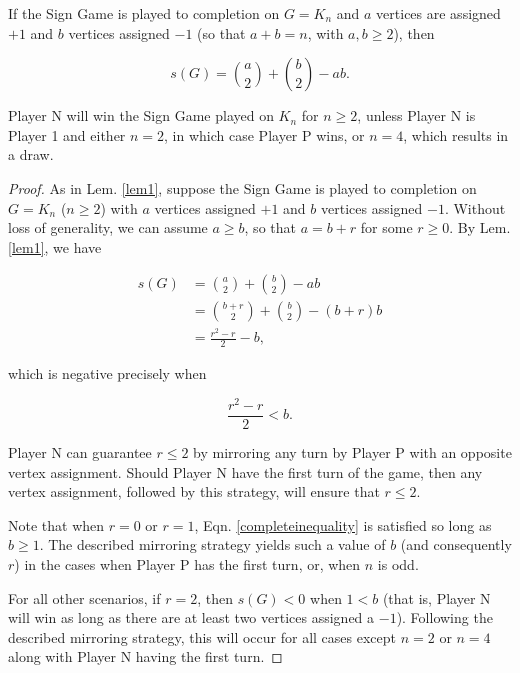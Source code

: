 \documentclass[10pt,a4paper]{amsart}
\begin{document}
\begin{lem} \label{lem1}
If the Sign Game is played to completion on $G = K_n$ and $a$ vertices are assigned $+1$ and $b$ vertices assigned $-1$ (so that $a+b = n$, with $a,b \geq 2$), then 

\begin{equation}
         s(G) = \binom{a}{2}+ \binom{b}{2}-ab.
    \end{equation}   
\end{lem}

\begin{thm} \label{thm1}
    Player N will win the Sign Game played on $K_n$ for $n\geq 2$, unless Player N is Player 1 and either $n=2$, in which case Player P wins, or $n=4$, which results in a draw.
\end{thm}

\begin{proof}
    As in Lem. \ref{lem1}, suppose the Sign Game is played to completion on $G=K_n$ ($n \geq 2$) with $a$ vertices assigned $+1$ and $b$ vertices assigned $-1$. Without loss of generality, we can assume $a \geq b$, so that $a = b+r$ for some $r \geq 0$. By Lem. \ref{lem1}, we have

    \begin{align}
        s(G) &= \binom{a}{2} + \binom{b}{2} -ab \\
        &= \binom{b+r}{2} + \binom{b}{2}-(b+r)b \\
        &=\frac{r^2-r}{2}-b,
    \end{align}

    
    \noindent which is negative precisely when 

    \begin{equation} \label{completeinequality}
         \frac{r^2-r}{2}<b.
    \end{equation}

    Player N can guarantee $r \leq 2$ by mirroring any turn by Player P with an opposite vertex assignment. Should Player N have the first turn of the game, then any vertex assignment, followed by this strategy, will ensure that $r \leq 2$.

    Note that when $r=0$ or $r=1$, Eqn. \ref{completeinequality} is satisfied so long as $b \geq 1$. The described mirroring strategy yields such a value of $b$ (and consequently $r$) in the cases when Player P has the first turn, or, when $n$ is odd.

    For all other scenarios, if $r=2$, then $s(G) < 0$ when $1 < b$ (that is, Player N will win as long as there are at least two vertices assigned a $-1$). Following the described mirroring strategy, this will occur for all cases except $n =2$ or $n=4$ along with Player N having the first turn.


\end{proof}
\end{document}
